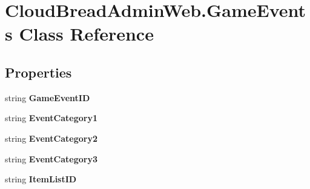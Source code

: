 \hypertarget{class_cloud_bread_admin_web_1_1_game_events}{}\section{Cloud\+Bread\+Admin\+Web.\+Game\+Events Class Reference}
\label{class_cloud_bread_admin_web_1_1_game_events}
\subsection*{Properties}
\begin{DoxyCompactItemize}
\item 
string {\bfseries Game\+Event\+ID}\hypertarget{class_cloud_bread_admin_web_1_1_game_events_a268d00ee35fbd04145b0d8f83666a251}{}\label{class_cloud_bread_admin_web_1_1_game_events_a268d00ee35fbd04145b0d8f83666a251}

\item 
string {\bfseries Event\+Category1}\hypertarget{class_cloud_bread_admin_web_1_1_game_events_aec2eb4874edadd56e566c8bbae7768bc}{}\label{class_cloud_bread_admin_web_1_1_game_events_aec2eb4874edadd56e566c8bbae7768bc}

\item 
string {\bfseries Event\+Category2}\hypertarget{class_cloud_bread_admin_web_1_1_game_events_a1dee1ebbb9c7f04926b19801b5ecd4be}{}\label{class_cloud_bread_admin_web_1_1_game_events_a1dee1ebbb9c7f04926b19801b5ecd4be}

\item 
string {\bfseries Event\+Category3}\hypertarget{class_cloud_bread_admin_web_1_1_game_events_adad11dbf67ceb0b69e7d291dfd81ee76}{}\label{class_cloud_bread_admin_web_1_1_game_events_adad11dbf67ceb0b69e7d291dfd81ee76}

\item 
string {\bfseries Item\+List\+ID}\hypertarget{class_cloud_bread_admin_web_1_1_game_events_ae12f6bea81a91fe610959f53a34e38e5}{}\label{class_cloud_bread_admin_web_1_1_game_events_ae12f6bea81a91fe610959f53a34e38e5}


\end{DoxyCompactItemize}
